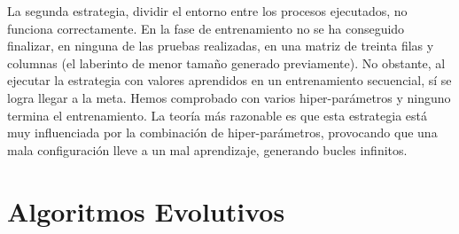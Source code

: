 				
		La segunda estrategia, dividir el entorno entre los procesos ejecutados, no funciona correctamente. En la fase de entrenamiento no se ha conseguido finalizar, en ninguna de las pruebas realizadas, en una matriz de treinta filas y columnas (el laberinto de menor tamaño generado previamente). No obstante, al ejecutar la estrategia con valores aprendidos en un entrenamiento secuencial, sí se logra llegar a la meta. Hemos comprobado con varios hiper-parámetros y ninguno termina el entrenamiento. La teoría más razonable es que esta estrategia está muy influenciada por la combinación de hiper-parámetros, provocando que una mala configuración lleve a un mal aprendizaje, generando bucles infinitos.
				
		
		
	
		
	
		

\section{Algoritmos Evolutivos}

